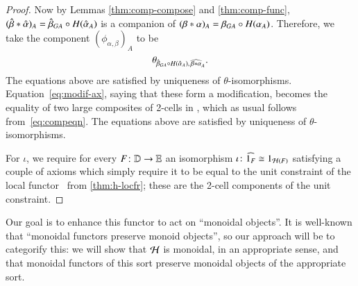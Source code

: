 \begin{proof}
  Now by Lemmas \ref{thm:comp-compose} and
  \ref{thm:comp-func}, $(\hat{\beta} *\hat{\alpha})_A = \hat{\beta}_{GA} \circ
  H(\hat{\alpha}_A)$ is a companion of $(\beta*\alpha)_A = \beta_{GA} \circ
  H(\alpha_A)$.  Therefore, we take the component $(\phi_{\alpha,\beta})_A$ to be
  \[\theta_{\hat{\beta}_{GA} \circ H(\hat{\alpha}_A),\, \widehat{\beta*\alpha}_A}.\]
  The equations above are satisfied by uniqueness of $\theta$-isomorphisms.
   Equation~\eqref{eq:modif-ax}, saying that these form a modification,
  becomes the equality of two large composites of 2-cells in \lD,
  which as usual follows from~\eqref{eq:compeqn}. The equations above are satisfied by uniqueness of $\theta$-isomorphisms.

  For $\iota$, we require for every $F\colon \mathbb{D}\to\mathbb{E}$ an isomorphism  $\iota\colon \widehat{1_F} \cong 1_{\mathcal{H}(F)}$ satisfying a couple of
  axioms which simply require it to be equal to the unit constraint of
  the local functor \cH\ from \autoref{thm:h-locfr}; these are the
  2-cell components of the unit constraint.  %
\end{proof}

Our goal is to enhance this functor to act on ``monoidal objects''.
It is well-known that ``monoidal functors preserve monoid objects'', so our approach will be to categorify this: we will show that $\mathcal{H}$ is monoidal, in an appropriate sense, and that monoidal functors of this sort preserve monoidal objects of the appropriate sort.

